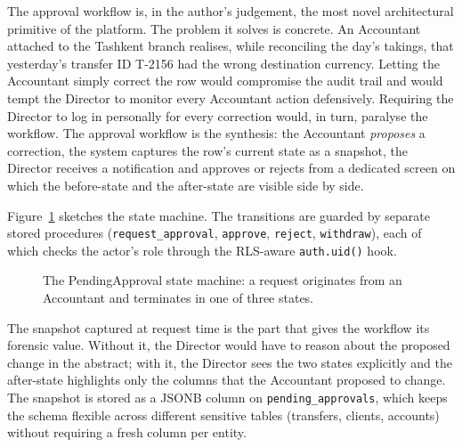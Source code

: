 The approval workflow is, in the author's judgement, the most novel architectural primitive of the platform. The problem it solves is concrete. An Accountant attached to the Tashkent branch realises, while reconciling the day's takings, that yesterday's transfer ID T-2156 had the wrong destination currency. Letting the Accountant simply correct the row would compromise the audit trail and would tempt the Director to monitor every Accountant action defensively. Requiring the Director to log in personally for every correction would, in turn, paralyse the workflow. The approval workflow is the synthesis: the Accountant \emph{proposes} a correction, the system captures the row's current state as a snapshot, the Director receives a notification and approves or rejects from a dedicated screen on which the before-state and the after-state are visible side by side.

Figure~\ref{fig:approval} sketches the state machine. The transitions are guarded by separate stored procedures (\texttt{request\_approval}, \texttt{approve}, \texttt{reject}, \texttt{withdraw}), each of which checks the actor's role through the RLS-aware \texttt{auth.uid()} hook.

\begin{figure}[h]
  \centering
  \caption{The PendingApproval state machine: a request originates from an Accountant and terminates in one of three states.}
  \label{fig:approval}
\end{figure}

The snapshot captured at request time is the part that gives the workflow its forensic value. Without it, the Director would have to reason about the proposed change in the abstract; with it, the Director sees the two states explicitly and the after-state highlights only the columns that the Accountant proposed to change. The snapshot is stored as a JSONB column on \texttt{pending\_approvals}, which keeps the schema flexible across different sensitive tables (transfers, clients, accounts) without requiring a fresh column per entity.

